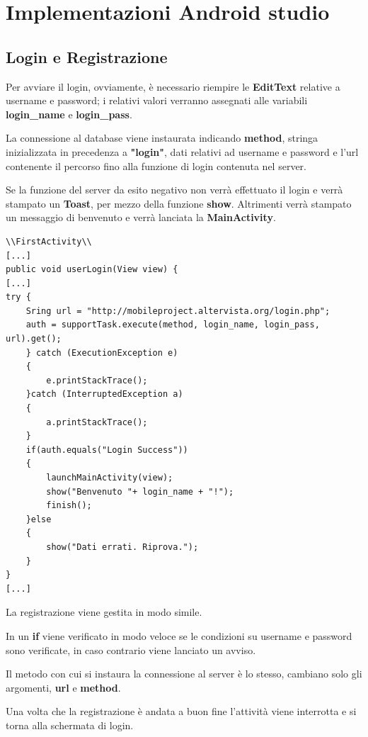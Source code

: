 \documentclass[a4paper, 50pt, twoside]{article}
\begin{document}
\section{Implementazioni Android studio}
\subsection{Login e Registrazione}
Per avviare il login, ovviamente, è necessario riempire le \textbf{EditText} relative a username e password; i relativi valori verranno assegnati alle variabili \textbf{login\_name} e \textbf{login\_pass}.

La connessione al database viene instaurata indicando \textbf{method}, stringa inizializzata in precedenza a \textbf{"login"}, dati relativi ad username e password e l'url contenente il percorso fino alla funzione di login contenuta nel server.

Se la funzione del server da esito negativo non verrà effettuato il login e verrà stampato un \textbf{Toast}, per mezzo della funzione \textbf{show}. Altrimenti verrà stampato un messaggio di benvenuto e verrà lanciata la \textbf{MainActivity}.
\begin{lstlisting}
\\FirstActivity\\
[...]
public void userLogin(View view) {
[...]
try {
	Sring url = "http://mobileproject.altervista.org/login.php";
	auth = supportTask.execute(method, login_name, login_pass, url).get();
	} catch (ExecutionException e)
	{
		e.printStackTrace();
	}catch (InterruptedException a)
	{
		a.printStackTrace();
	}
	if(auth.equals("Login Success"))
	{
		launchMainActivity(view);
		show("Benvenuto "+ login_name + "!");
		finish();
	}else
	{
		show("Dati errati. Riprova.");
	}
}
[...]
\end{lstlisting}

La registrazione viene gestita in modo simile.

In un \textbf{if} viene verificato in modo veloce se le condizioni su username e password sono verificate, in caso contrario viene lanciato un avviso.

Il metodo con cui si instaura la connessione al server è lo stesso, cambiano solo gli argomenti, \textbf{url} e \textbf{method}.

Una volta che la registrazione è andata a buon fine l'attività viene interrotta e si torna alla schermata di login.
\end{document}

